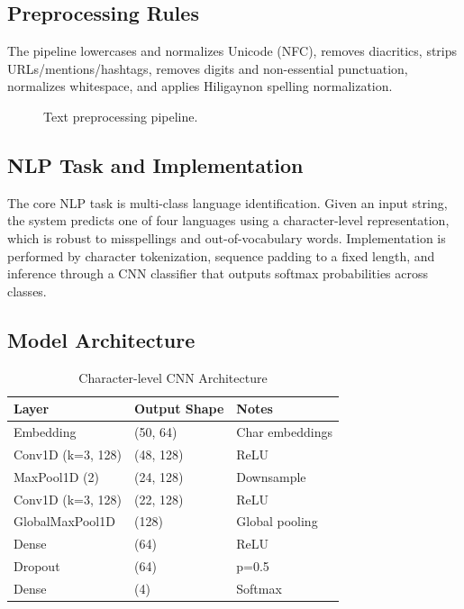 \documentclass[conference]{IEEEtran}
\begin{document}
\subsection{Preprocessing Rules}
The pipeline lowercases and normalizes Unicode (NFC), removes diacritics, strips URLs/mentions/hashtags, removes digits and non-essential punctuation, normalizes whitespace, and applies Hiligaynon spelling normalization.

\begin{figure}[htbp]
\centering
{}
\caption{Text preprocessing pipeline.}
\label{fig:preprocess-flow}
\end{figure}

\subsection{NLP Task and Implementation}
The core NLP task is multi-class language identification. Given an input string, the system predicts one of four languages using a character-level representation, which is robust to misspellings and out-of-vocabulary words. Implementation is performed by character tokenization, sequence padding to a fixed length, and inference through a CNN classifier that outputs softmax probabilities across classes.

\subsection{Model Architecture}
\begin{table}[htbp]
\caption{Character-level CNN Architecture}
\label{tab:architecture}
\centering
\begin{tabular}{lll}
\hline
\textbf{Layer} & \textbf{Output Shape} & \textbf{Notes} \\
\hline
Embedding & (50, 64) & Char embeddings \\
Conv1D (k=3, 128) & (48, 128) & ReLU \\
MaxPool1D (2) & (24, 128) & Downsample \\
Conv1D (k=3, 128) & (22, 128) & ReLU \\
GlobalMaxPool1D & (128) & Global pooling \\
Dense & (64) & ReLU \\
Dropout & (64) & p=0.5 \\
Dense & (4) & Softmax \\
\hline
\end{tabular}
\end{table}
\end{document}
